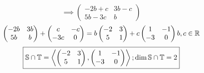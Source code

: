 \documentclass[../practica.root.tex]{subfiles}
\begin{document}
\begin{enumerate}
\begin{enumerate}
\[                        \implies
                        \begin{pmatrix}
                            -2b + c & 3b - c \\
                            5b - 3c & b
                        \end{pmatrix}
                    \] \[
                        \begin{pmatrix}
                            -2b & 3b \\
                            5b  & b
                        \end{pmatrix}
                        +
                        \begin{pmatrix}
                            c   & -c \\
                            -3c & 0
                        \end{pmatrix}
                        =
                        b
                        \begin{pmatrix}
                            -2 & 3 \\
                            5  & 1
                        \end{pmatrix}
                        +
                        c
                        \begin{pmatrix}
                            1  & -1 \\
                            -3 & 0
                        \end{pmatrix}
                        b,c \in \mathbb{R}
                    \]
                    \[
                        \boxed{
                            \mathbb{S} \cap \mathbb{T} = \left\langle
                            \begin{pmatrix}
                                -2 & 3 \\
                                5  & 1
                            \end{pmatrix},
                            \begin{pmatrix}
                                1  & -1 \\
                                -3 & 0
                            \end{pmatrix}
                            \right\rangle;
                            \dim{\mathbb{S}\cap \mathbb{T}} = 2
                        }
                    \]



\end{enumerate}
\end{enumerate}
\end{document}
